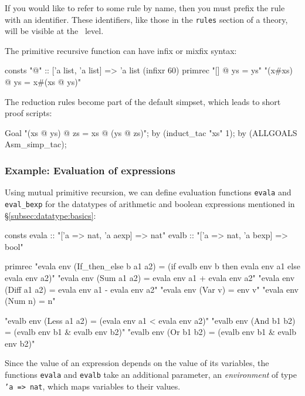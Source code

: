 If you would like to refer to some rule by name, then you must prefix
the rule with an identifier.  These identifiers, like those in the
\texttt{rules} section of a theory, will be visible at the \ML\ level.

The primitive recursive function can have infix or mixfix syntax:
\begin{ttbox}\underscoreon
consts "@"  :: ['a list, 'a list] => 'a list  (infixr 60)
primrec
   "[] @ ys = ys"
   "(x#xs) @ ys = x#(xs @ ys)"
\end{ttbox}

The reduction rules become part of the default simpset, which
leads to short proof scripts:
\begin{ttbox}\underscoreon
Goal "(xs @ ys) @ zs = xs @ (ys @ zs)";
by (induct\_tac "xs" 1);
by (ALLGOALS Asm\_simp\_tac);
\end{ttbox}

\subsubsection{Example: Evaluation of expressions}
Using mutual primitive recursion, we can define evaluation functions \texttt{evala}
and \texttt{eval_bexp} for the datatypes of arithmetic and boolean expressions mentioned in
\S\ref{subsec:datatype:basics}:
\begin{ttbox}
consts
  evala :: "['a => nat, 'a aexp] => nat"
  evalb :: "['a => nat, 'a bexp] => bool"

primrec
  "evala env (If_then_else b a1 a2) =
     (if evalb env b then evala env a1 else evala env a2)"
  "evala env (Sum a1 a2) = evala env a1 + evala env a2"
  "evala env (Diff a1 a2) = evala env a1 - evala env a2"
  "evala env (Var v) = env v"
  "evala env (Num n) = n"

  "evalb env (Less a1 a2) = (evala env a1 < evala env a2)"
  "evalb env (And b1 b2) = (evalb env b1 & evalb env b2)"
  "evalb env (Or b1 b2) = (evalb env b1 & evalb env b2)"
\end{ttbox}
Since the value of an expression depends on the value of its variables,
the functions \texttt{evala} and \texttt{evalb} take an additional
parameter, an {\em environment} of type \texttt{'a => nat}, which maps
variables to their values.


